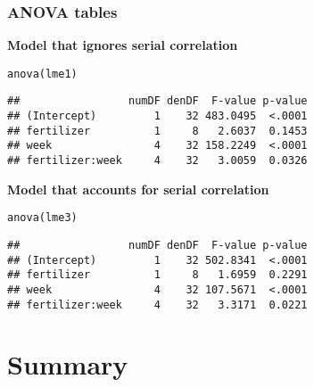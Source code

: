 \documentclass[color=usenames,dvipsnames]{beamer}\usepackage[]{graphicx}\usepackage[]{color}
\makeatletter
\newcommand{\hlstd}[1]{\textcolor[rgb]{0,0,0}{#1}}%
\newcommand{\hlkwd}[1]{\textcolor[rgb]{0.004,0.004,0.506}{#1}}%
\newenvironment{kframe}{%
 \def\at@end@of@kframe{}%
 \ifinner\ifhmode%
  \def\at@end@of@kframe{\end{minipage}}%
  \begin{minipage}{\columnwidth}%
 \fi\fi%
 \def\FrameCommand##1{\hskip\@totalleftmargin \hskip-\fboxsep
 \colorbox{shadecolor}{##1}\hskip-\fboxsep
     \hskip-\linewidth \hskip-\@totalleftmargin \hskip\columnwidth}%
 \MakeFramed {\advance\hsize-\width
   \@totalleftmargin\z@ \linewidth\hsize
   \@setminipage}}%
 {\par\unskip\endMakeFramed%
 \at@end@of@kframe}
\newenvironment{knitrout}{}{} %
\makeatother
\begin{document}
\begin{frame}[fragile]
  \frametitle{ANOVA tables}
  {\bf Model that ignores serial correlation}
\begin{knitrout}\scriptsize
{}\color{fgcolor}\begin{kframe}
\begin{alltt}
\hlkwd{anova}\hlstd{(lme1)}
\end{alltt}
\begin{verbatim}
##                 numDF denDF  F-value p-value
## (Intercept)         1    32 483.0495  <.0001
## fertilizer          1     8   2.6037  0.1453
## week                4    32 158.2249  <.0001
## fertilizer:week     4    32   3.0059  0.0326
\end{verbatim}
\end{kframe}
\end{knitrout}
  {\bf Model that accounts for serial correlation}
\begin{knitrout}\scriptsize
{}\color{fgcolor}\begin{kframe}
\begin{alltt}
\hlkwd{anova}\hlstd{(lme3)}
\end{alltt}
\begin{verbatim}
##                 numDF denDF  F-value p-value
## (Intercept)         1    32 502.8341  <.0001
## fertilizer          1     8   1.6959  0.2291
## week                4    32 107.5671  <.0001
## fertilizer:week     4    32   3.3171  0.0221
\end{verbatim}
\end{kframe}
\end{knitrout}
\end{frame}



\section{Summary}
\end{document}

